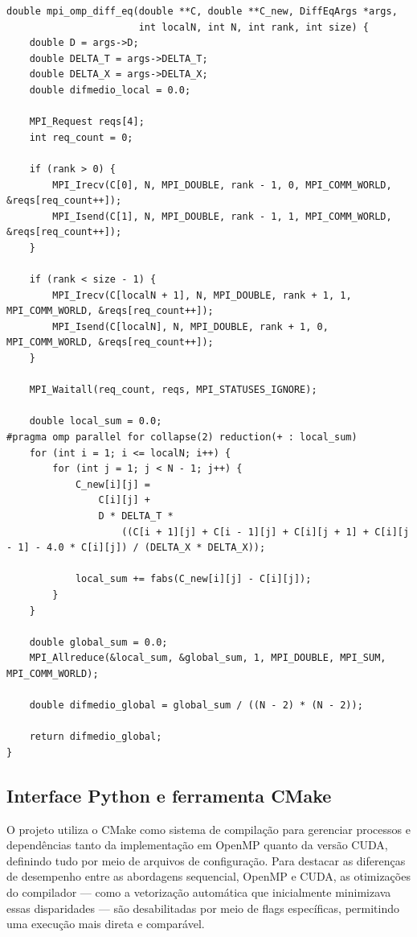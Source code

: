 \documentclass[12pt]{article}
\begin{document}
\begin{lstlisting}[style=CStyle, caption={Implementação paralelizada utilizando MPI.}, label={cod:mpi}]
double mpi_omp_diff_eq(double **C, double **C_new, DiffEqArgs *args,
                       int localN, int N, int rank, int size) {
    double D = args->D;
    double DELTA_T = args->DELTA_T;
    double DELTA_X = args->DELTA_X;
    double difmedio_local = 0.0;

    MPI_Request reqs[4];
    int req_count = 0;

    if (rank > 0) {
        MPI_Irecv(C[0], N, MPI_DOUBLE, rank - 1, 0, MPI_COMM_WORLD, &reqs[req_count++]);
        MPI_Isend(C[1], N, MPI_DOUBLE, rank - 1, 1, MPI_COMM_WORLD, &reqs[req_count++]);
    }

    if (rank < size - 1) {
        MPI_Irecv(C[localN + 1], N, MPI_DOUBLE, rank + 1, 1, MPI_COMM_WORLD, &reqs[req_count++]);
        MPI_Isend(C[localN], N, MPI_DOUBLE, rank + 1, 0, MPI_COMM_WORLD, &reqs[req_count++]);
    }

    MPI_Waitall(req_count, reqs, MPI_STATUSES_IGNORE);

    double local_sum = 0.0;
#pragma omp parallel for collapse(2) reduction(+ : local_sum)
    for (int i = 1; i <= localN; i++) {
        for (int j = 1; j < N - 1; j++) {
            C_new[i][j] =
                C[i][j] +
                D * DELTA_T *
                    ((C[i + 1][j] + C[i - 1][j] + C[i][j + 1] + C[i][j - 1] - 4.0 * C[i][j]) / (DELTA_X * DELTA_X));

            local_sum += fabs(C_new[i][j] - C[i][j]);
        }
    }

    double global_sum = 0.0;
    MPI_Allreduce(&local_sum, &global_sum, 1, MPI_DOUBLE, MPI_SUM, MPI_COMM_WORLD);

    double difmedio_global = global_sum / ((N - 2) * (N - 2));

    return difmedio_global;
}
\end{lstlisting}

\subsection{Interface Python e ferramenta CMake}

O projeto utiliza o CMake como sistema de compilação para gerenciar processos e
dependências tanto da implementação em OpenMP quanto da versão CUDA, definindo
tudo por meio de arquivos de configuração. Para destacar as diferenças de
desempenho entre as abordagens sequencial, OpenMP e CUDA, as otimizações do
compilador — como a vetorização automática que inicialmente minimizava essas
disparidades — são desabilitadas por meio de flags específicas, permitindo uma
execução mais direta e comparável.
\end{document}
